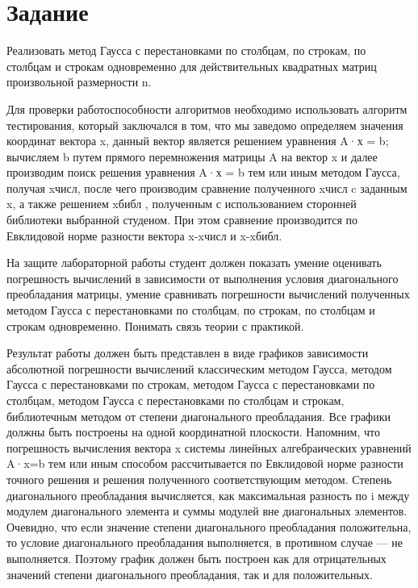 \documentclass[a4paper, 14pt]{extarticle}
\begin{document}
\renewcommand{\ttdefault}{pcr}

\setlength{\tabcolsep}{3pt}
\newpage
\setcounter{page}{2}

\section{Задание}\label{Sect::task}

Реализовать метод Гаусса с перестановками по столбцам, по строкам, по столбцам и строкам одновременно для действительных квадратных матриц произвольной размерности n. 

Для проверки работоспособности алгоритмов необходимо использовать алгоритм тестирования, который заключался в том, что мы заведомо определяем значения координат вектора x, данный вектор является решением уравнения A·х = b; вычисляем b путем прямого перемножения матрицы A на вектор x и далее производим поиск решения уравнения A·х = b тем или иным методом Гаусса,  получая xчисл, после чего производим сравнение полученного  xчисл c заданным x, а также решением xбибл , полученным с использованием сторонней библиотеки выбранной студеном. При этом сравнение производится по Евклидовой норме разности вектора x-xчисл и x-xбибл.

На защите лабораторной работы студент должен показать умение оценивать погрешность вычислений в зависимости от выполнения  условия диагонального преобладания матрицы, умение сравнивать погрешности вычислений полученных методом Гаусса с перестановками по столбцам, по строкам, по столбцам и строкам одновременно. Понимать связь теории с практикой.

Результат работы должен быть представлен в виде графиков зависимости абсолютной погрешности вычислений классическим методом Гаусса, методом Гаусса с перестановками по строкам, методом Гаусса с перестановками по столбцам, методом Гаусса с перестановками по столбцам и строкам, библиотечным методом от степени диагонального преобладания. Все графики должны быть построены на одной координатной плоскости. Напомним, что погрешность вычисления вектора x системы линейных алгебраических уравнений A·x=b тем или иным способом рассчитывается по Евклидовой норме разности точного решения и решения полученного соответствующим методом. Степень диагонального преобладания вычисляется, как максимальная разность по i между модулем диагонального элемента и суммы модулей вне диагональных элементов. Очевидно, что если значение степени диагонального преобладания положительна, то условие диагонального преобладания выполняется, в противном случае — не выполняется. Поэтому график должен быть построен как для отрицательных значений  степени диагонального преобладания, так и для положительных.
\end{document}
